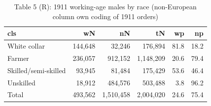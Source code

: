 \begin{table}

\caption{Table 5 (R): 1911 working-age males by race (non-European column own coding of 1911 orders)}
\centering
\begin{tabular}[t]{lrrrrr}
\toprule
cls & wN & nN & tN & wp & np\\
\midrule
White collar & 144,648 & 32,246 & 176,894 & 81.8 & 18.2\\
Farmer & 236,057 & 912,152 & 1,148,209 & 20.6 & 79.4\\
Skilled/semi-skilled & 93,945 & 81,484 & 175,429 & 53.6 & 46.4\\
Unskilled & 18,912 & 484,576 & 503,488 & 3.8 & 96.2\\
Total & 493,562 & 1,510,458 & 2,004,020 & 24.6 & 75.4\\
\bottomrule
\end{tabular}
\end{table}
